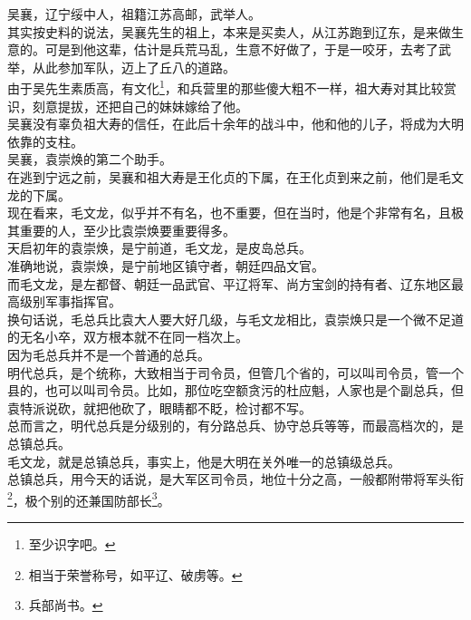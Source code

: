 \begin{multicols}{\theparacolNo}
吴襄，辽宁绥中人，祖籍江苏高邮，武举人。\\

其实按史料的说法，吴襄先生的祖上，本来是买卖人，从江苏跑到辽东，是来做生意的。可是到他这辈，估计是兵荒马乱，生意不好做了，于是一咬牙，去考了武举，从此参加军队，迈上了丘八的道路。\\

由于吴先生素质高，有文化\footnote{至少识字吧。}，和兵营里的那些傻大粗不一样，祖大寿对其比较赏识，刻意提拔，还把自己的妹妹嫁给了他。\\

吴襄没有辜负祖大寿的信任，在此后十余年的战斗中，他和他的儿子，将成为大明依靠的支柱。\\

吴襄，袁崇焕的第二个助手。\\

在逃到宁远之前，吴襄和祖大寿是王化贞的下属，在王化贞到来之前，他们是毛文龙的下属。\\

现在看来，毛文龙，似乎并不有名，也不重要，但在当时，他是个非常有名，且极其重要的人，至少比袁崇焕要重要得多。\\

天启初年的袁崇焕，是宁前道，毛文龙，是皮岛总兵。\\

准确地说，袁崇焕，是宁前地区镇守者，朝廷四品文官。\\

而毛文龙，是左都督、朝廷一品武官、平辽将军、尚方宝剑的持有者、辽东地区最高级别军事指挥官。\\

换句话说，毛总兵比袁大人要大好几级，与毛文龙相比，袁崇焕只是一个微不足道的无名小卒，双方根本就不在同一档次上。\\

因为毛总兵并不是一个普通的总兵。\\

明代总兵，是个统称，大致相当于司令员，但管几个省的，可以叫司令员，管一个县的，也可以叫司令员。比如，那位吃空额贪污的杜应魁，人家也是个副总兵，但袁特派说砍，就把他砍了，眼睛都不眨，检讨都不写。\\

总而言之，明代总兵是分级别的，有分路总兵、协守总兵等等，而最高档次的，是总镇总兵。\\

毛文龙，就是总镇总兵，事实上，他是大明在关外唯一的总镇级总兵。\\

总镇总兵，用今天的话说，是大军区司令员，地位十分之高，一般都附带将军头衔\footnote{相当于荣誉称号，如平辽、破虏等。}，极个别的还兼国防部长\footnote{兵部尚书。}。\\


\end{multicols}

